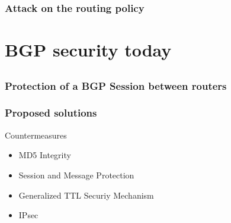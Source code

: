 \documentclass[notes=hide,yellow]{beamer}
\begin{document}
\begin{frame}
	\frametitle{Attack on the routing policy}
\end{frame}


\section{BGP security today}
\subsection*{}
%
%
%

\begin{frame}
	\frametitle{Protection of a BGP Session between routers}
\end{frame}



\begin{frame}
	\frametitle{Proposed solutions}
	\begin{block}{Countermeasures}
	\begin{itemize}
		\item MD5 Integrity
		\item Session and Message Protection
		\item Generalized TTL Securiy Mechanism
		\item IPsec
	\end{itemize}
	\end{block}

\end{frame}
%
%
%
%
%
%
%
%
\end{document}
